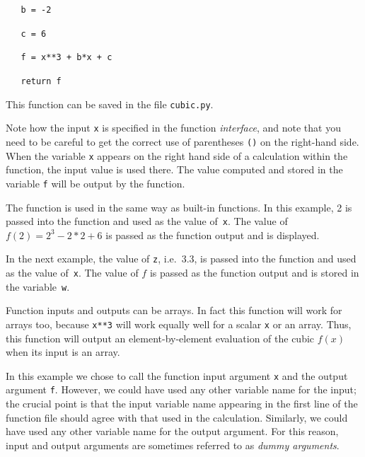 \noindent
\texttt{\ \ \ b = -2}

\noindent
\texttt{\ \ \ c = 6}

\noindent
\texttt{\ \ \ f = x**3 + b*x + c}

\noindent
\texttt{\ \ \ return f}

\vspace{3mm}

\noindent
This function can be saved in the file \texttt{cubic.py}.

Note how the input \texttt{x} is specified in the function
\textit{interface}, and note that you need to be careful to get the
correct use of parentheses \texttt{()} on the right-hand side.  When
the variable \texttt{x} appears on the right hand side of a
calculation within the function, the input value is used there.  The
value computed and stored in the variable \texttt{f} will be output by
the function.

The function is used in the same way as built-in functions. In this example,
2 is passed into the function and used as the value of~\texttt{x}.
The value of $f(2)=2^3-2*2+6$ is passed as the function output and is displayed.




\noindent
In the next example,
the value of \texttt{z}, i.e.\ 3.3, is passed into the function and used as
the value of~\texttt{x}. The value of $f$ is passed as the function output
and is stored in the variable~\texttt{w}.



Function inputs and outputs can be arrays. In fact
this function will work for arrays too, because
\texttt{x**3} will work equally well for a scalar \texttt{x} or an array.
Thus, this function will output an element-by-element evaluation of the
cubic $f(x)$ when its input is an array.





In this example we chose to call the function input argument
\texttt{x} and the output argument \texttt{f}. However, we could have
used any other variable name for the input; the crucial point is that
the input variable name appearing in the first line of the function
file should agree with that used in the calculation. Similarly, we
could have used any other variable name for the output argument. For
this reason, input and output arguments are sometimes referred to as
\textit{dummy arguments}.


